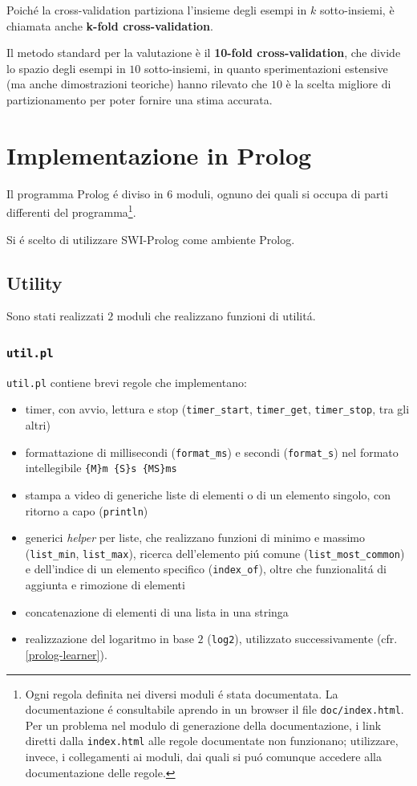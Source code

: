 \documentclass[preprint]{acm_proc_article-sp}
\begin{document}
Poiché la cross-validation partiziona l'insieme degli esempi in $k$ sotto-insiemi, è chiamata anche \textbf{k-fold cross-validation}.

Il metodo standard per la valutazione è il \textbf{10-fold cross-validation}, che divide lo spazio degli esempi in $10$ sotto-insiemi, in quanto sperimentazioni estensive (ma anche dimostrazioni teoriche) hanno rilevato che $10$ è la scelta migliore di partizionamento per poter fornire una stima accurata.

\section{Implementazione in Prolog}
\label{prolog}
Il programma Prolog \'e diviso in $6$ moduli, ognuno dei quali si occupa di parti differenti del programma\footnote{Ogni regola definita nei diversi moduli \'e stata documentata. La documentazione \'e consultabile aprendo in un browser il file \texttt{doc/index.html}. Per un problema nel modulo di generazione della documentazione, i link diretti dalla \texttt{index.html} alle regole documentate non funzionano; utilizzare, invece, i collegamenti ai moduli, dai quali si pu\'o comunque accedere alla documentazione delle regole.}.

Si \'e scelto di utilizzare SWI-Prolog\cite{SWI:2014:Online} come ambiente Prolog.

\subsection{Utility}
\label{prolog-utility}
Sono stati realizzati $2$ moduli che realizzano funzioni di utilit\'a.

\subsubsection{\texttt{util.pl}}
\verb|util.pl| contiene brevi regole che implementano:
\begin{itemize}
\item timer, con avvio, lettura e stop (\verb|timer_start|, \verb|timer_get|, \verb|timer_stop|, tra gli altri)
\item formattazione di millisecondi (\verb|format_ms|) e secondi (\verb|format_s|) nel formato intellegibile \texttt{\{M\}m \{S\}s \{MS\}ms}
\item stampa a video di generiche liste di elementi o di un elemento singolo, con ritorno a capo (\verb|println|)
\item generici \textit{helper} per liste, che realizzano funzioni di minimo e massimo (\verb|list_min|, \verb|list_max|), ricerca dell'elemento pi\'u comune (\verb|list_most_common|) e dell'indice di un elemento specifico (\verb|index_of|), oltre che funzionalit\'a di aggiunta e rimozione di elementi
\item concatenazione di elementi di una lista in una stringa
\item realizzazione del logaritmo in base $2$ (\verb|log2|), utilizzato successivamente (cfr. \ref{prolog-learner}).
\end{itemize}
\end{document}
